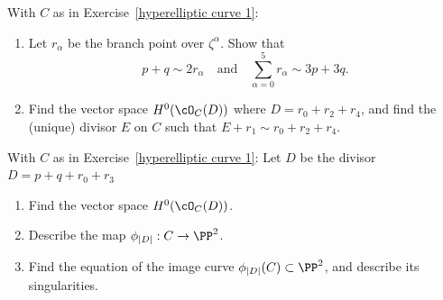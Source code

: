 \begin{exercise} With $C$ as in Exercise~\ref{hyperelliptic curve 1}:
\begin{enumerate}

\item Let $r_\alpha$ be the branch point over $\zeta^\alpha$. Show that
$$
p+q \sim 2r_\alpha \quad \text{and} \quad \sum_{\alpha = 0}^5 r_\alpha \sim 3p+3q.
$$

\item Find the vector space $H^0(\cO_C(D))$ where $D = r_0 + r_2 + r_4$, and find the (unique) divisor $E$ on $C$ such that $E + r_1 \sim r_0 + r_2 + r_4$.

\end{enumerate}

\end{exercise}


\begin{exercise}
With $C$ as in Exercise~\ref{hyperelliptic curve 1}:
Let $D$ be the divisor $D = p + q + r_0 + r_3$
\begin{enumerate}
\item Find the vector space $H^0(\cO_C(D))$.
\item Describe the map $\phi_{|D|} : C \to \PP^2$.
\item Find the equation of the image curve $\phi_{|D|}(C) \subset \PP^2$, and describe its singularities.
\end{enumerate}
\end{exercise}

